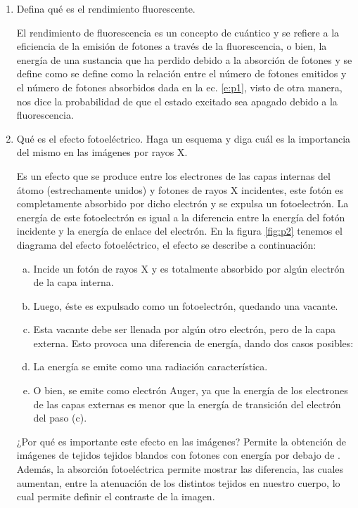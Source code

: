 \newlength{\strutheight}
\settoheight{\strutheight}{\strut}


\begin{enumerate}[1.]
\item Defina qué es el rendimiento fluorescente.

El rendimiento de fluorescencia \ec{\Phi} es un concepto de cuántico y se refiere a la eficiencia de la emisión de fotones a través de la fluorescencia, o bien,  la energía de una sustancia que ha perdido debido a la absorción de fotones y se define como se define como la relación entre el número de fotones emitidos y el número de fotones absorbidos dada en la ec. \ref{e:p1}, visto de otra manera, nos dice la probabilidad de que el estado excitado sea apagado debido a la fluorescencia.


\item  Qué es el efecto fotoeléctrico. Haga un esquema y diga cuál es la importancia del mismo en las imágenes por rayos X.

Es un efecto que se produce entre los electrones de las capas internas del átomo (estrechamente unidos) y fotones de rayos X incidentes, este fotón es completamente absorbido por dicho electrón y se expulsa un fotoelectrón. La energía de este fotoelectrón es igual a la diferencia entre la energía del fotón incidente y la energía de enlace del electrón. En la figura \ref{fig:p2} tenemos el diagrama del efecto fotoeléctrico, el efecto se describe a continuación:
\begin{enumerate}[(a)]
  \item Incide un fotón de rayos X y es totalmente absorbido por algún electrón de la capa interna.
  \item Luego, éste es expulsado como un fotoelectrón, quedando una vacante.
  \item Esta vacante debe ser llenada por algún otro electrón, pero de la capa externa. Esto provoca una diferencia de energía, dando dos casos posibles:
  \item La energía se emite  como una radiación característica.
  \item O bien, se emite como electrón Auger, ya que la energía de los electrones de las capas externas es menor que la energía de transición del electrón del paso (c).
\end{enumerate}


¿Por qué es importante este efecto en las imágenes? Permite la obtención de imágenes de  tejidos tejidos blandos con fotones con energía por debajo de . Además,  la absorción fotoeléctrica permite mostrar las diferencia, las cuales aumentan, entre la atenuación de los distintos tejidos en nuestro cuerpo, lo cual permite definir el contraste de la imagen.


\end{enumerate}
